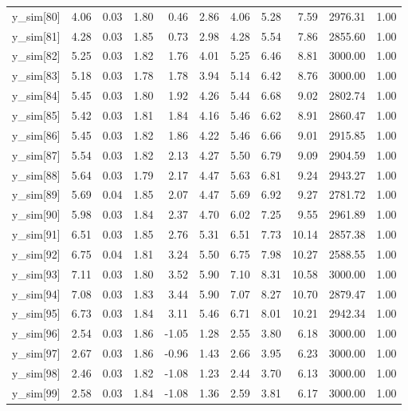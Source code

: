 \begin{table}[ht]
\begin{tabular}{rrrrrrrrrrr}
  y\_sim[80] & 4.06 & 0.03 & 1.80 & 0.46 & 2.86 & 4.06 & 5.28 & 7.59 & 2976.31 & 1.00 \\ 
  y\_sim[81] & 4.28 & 0.03 & 1.85 & 0.73 & 2.98 & 4.28 & 5.54 & 7.86 & 2855.60 & 1.00 \\ 
  y\_sim[82] & 5.25 & 0.03 & 1.82 & 1.76 & 4.01 & 5.25 & 6.46 & 8.81 & 3000.00 & 1.00 \\ 
  y\_sim[83] & 5.18 & 0.03 & 1.78 & 1.78 & 3.94 & 5.14 & 6.42 & 8.76 & 3000.00 & 1.00 \\ 
  y\_sim[84] & 5.45 & 0.03 & 1.80 & 1.92 & 4.26 & 5.44 & 6.68 & 9.02 & 2802.74 & 1.00 \\ 
  y\_sim[85] & 5.42 & 0.03 & 1.81 & 1.84 & 4.16 & 5.46 & 6.62 & 8.91 & 2860.47 & 1.00 \\ 
  y\_sim[86] & 5.45 & 0.03 & 1.82 & 1.86 & 4.22 & 5.46 & 6.66 & 9.01 & 2915.85 & 1.00 \\ 
  y\_sim[87] & 5.54 & 0.03 & 1.82 & 2.13 & 4.27 & 5.50 & 6.79 & 9.09 & 2904.59 & 1.00 \\ 
  y\_sim[88] & 5.64 & 0.03 & 1.79 & 2.17 & 4.47 & 5.63 & 6.81 & 9.24 & 2943.27 & 1.00 \\ 
  y\_sim[89] & 5.69 & 0.04 & 1.85 & 2.07 & 4.47 & 5.69 & 6.92 & 9.27 & 2781.72 & 1.00 \\ 
  y\_sim[90] & 5.98 & 0.03 & 1.84 & 2.37 & 4.70 & 6.02 & 7.25 & 9.55 & 2961.89 & 1.00 \\ 
  y\_sim[91] & 6.51 & 0.03 & 1.85 & 2.76 & 5.31 & 6.51 & 7.73 & 10.14 & 2857.38 & 1.00 \\ 
  y\_sim[92] & 6.75 & 0.04 & 1.81 & 3.24 & 5.50 & 6.75 & 7.98 & 10.27 & 2588.55 & 1.00 \\ 
  y\_sim[93] & 7.11 & 0.03 & 1.80 & 3.52 & 5.90 & 7.10 & 8.31 & 10.58 & 3000.00 & 1.00 \\ 
  y\_sim[94] & 7.08 & 0.03 & 1.83 & 3.44 & 5.90 & 7.07 & 8.27 & 10.70 & 2879.47 & 1.00 \\ 
  y\_sim[95] & 6.73 & 0.03 & 1.84 & 3.11 & 5.46 & 6.71 & 8.01 & 10.21 & 2942.34 & 1.00 \\ 
  y\_sim[96] & 2.54 & 0.03 & 1.86 & -1.05 & 1.28 & 2.55 & 3.80 & 6.18 & 3000.00 & 1.00 \\ 
  y\_sim[97] & 2.67 & 0.03 & 1.86 & -0.96 & 1.43 & 2.66 & 3.95 & 6.23 & 3000.00 & 1.00 \\ 
  y\_sim[98] & 2.46 & 0.03 & 1.82 & -1.08 & 1.23 & 2.44 & 3.70 & 6.13 & 3000.00 & 1.00 \\ 
  y\_sim[99] & 2.58 & 0.03 & 1.84 & -1.08 & 1.36 & 2.59 & 3.81 & 6.17 & 3000.00 & 1.00 \\ 

\end{tabular}
\end{table}
